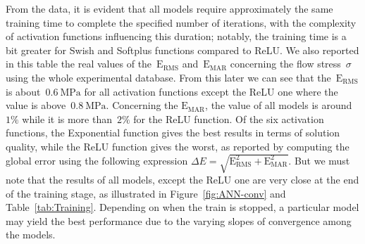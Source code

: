 \documentclass[algorithms,article,submit,pdftex,oneauthors]{Definitions/mdpi}
\DeclareRobustCommand{\RMSE}{\text{E}_\text{RMS}}
\DeclareRobustCommand{\MARE}{\text{E}_\text{MAR}}
\DeclareRobustCommand{\MPa}{\text{MPa}}
\begin{document}
From the data, it is evident that all models require approximately the same training time to complete the specified number of iterations, with the complexity of activation functions influencing this duration; notably, the training time is a bit greater for Swish and Softplus functions compared to ReLU.
We also reported in this table the real values of the~$\RMSE$ and~$\MARE$ concerning the flow stress~$\sigma$ using the whole experimental database.
From this later we can see that the~$\RMSE$ is about~$0.6~\MPa$ for all activation functions except the ReLU one where the value is above~$0.8~\MPa$.
Concerning the $\MARE$, the value of all models is around~$1\%$ while it is more than~$2\%$ for the ReLU function.
Of the six activation functions, the Exponential function gives the best results in terms of solution quality, while the ReLU function gives the worst, as reported by computing the global error using the following expression $\Delta E=\sqrt{\RMSE^2+\MARE^2}$.
But we must note that the results of all models, except the ReLU one are very close at the end of the training stage, as illustrated in Figure~\ref{fig:ANN-conv} and Table~\ref{tab:Training}.
Depending on when the train is stopped, a particular model may yield the best performance due to the varying slopes of convergence among the models.
\end{document}
